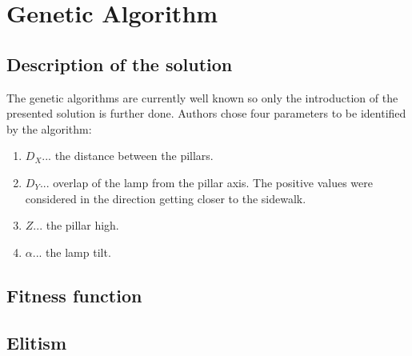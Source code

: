 \section{Genetic Algorithm}
\subsection{Description of the solution}
The genetic algorithms are currently well known so only the introduction of the presented solution is further done. Authors chose four parameters to be identified by the algorithm:

\begin{enumerate}
	\item $D_X$... the distance between the pillars.
	\item $D_Y$... overlap of the lamp from the pillar axis. The positive values were considered in the direction getting closer to the sidewalk.
	\item $Z$... the pillar high.
	\item $\alpha$... the lamp tilt.
\end{enumerate}

\subsection{Fitness function}
\subsection{Elitism}